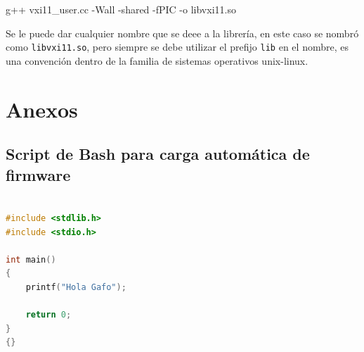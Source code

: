 \documentclass[paper=letter,oneside,fontsize=11pt, parskip=full]{scrartcl}
\newenvironment{code}
	{\begin{adjustwidth}{1.0cm}{0.0cm}\ttfamily}
	{\end{adjustwidth}}
\begin{document}
	\begin{code}
		g++ vxi11\_user.cc -Wall -shared -fPIC -o libvxi11.so
	\end{code}
	
	Se le puede dar cualquier nombre que se deee a la librería, en este caso se nombró como \texttt{libvxi11.so}, pero siempre se debe utilizar el prefijo \texttt{lib} en el nombre, es una convención dentro de la familia de sistemas operativos unix-linux.	
	
	
			
	\section{Anexos}	
		
		\subsection{Script de Bash para carga automática de firmware}
	
			\begin{lstlisting}[language=c,caption={Listado programa}]
	
#include <stdlib.h>
#include <stdio.h>

int main()
{
	printf("Hola Gafo");
	
	return 0;
}
{}
		\end{lstlisting}
\end{document}
